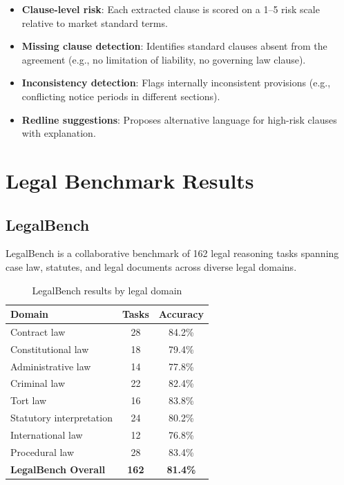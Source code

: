 \documentclass[11pt,a4paper]{article}
\begin{document}
\begin{itemize}
  \item \textbf{Clause-level risk}: Each extracted clause is scored on a 1--5 risk scale relative to market standard terms.
  \item \textbf{Missing clause detection}: Identifies standard clauses absent from the agreement (e.g., no limitation of liability, no governing law clause).
  \item \textbf{Inconsistency detection}: Flags internally inconsistent provisions (e.g., conflicting notice periods in different sections).
  \item \textbf{Redline suggestions}: Proposes alternative language for high-risk clauses with explanation.
\end{itemize}

\section{Legal Benchmark Results}

\subsection{LegalBench}

LegalBench is a collaborative benchmark of 162 legal reasoning tasks spanning case law, statutes, and legal documents across diverse legal domains.

\begin{table}[H]
\centering
\caption{LegalBench results by legal domain}
\label{tab:legalbench}
\begin{tabular}{lcc}
\toprule
Domain & Tasks & Accuracy \\
\midrule
Contract law & 28 & 84.2\% \\
Constitutional law & 18 & 79.4\% \\
Administrative law & 14 & 77.8\% \\
Criminal law & 22 & 82.4\% \\
Tort law & 16 & 83.8\% \\
Statutory interpretation & 24 & 80.2\% \\
International law & 12 & 76.8\% \\
Procedural law & 28 & 83.4\% \\
\midrule
\textbf{LegalBench Overall} & \textbf{162} & \textbf{81.4\%} \\
\bottomrule
\end{tabular}
\end{table}
\end{document}
